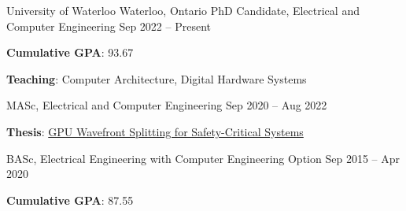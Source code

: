 

\begin{cventries}

\begin{cventrymulti}
{University of Waterloo}
{Waterloo, Ontario}
\cvposition
{PhD Candidate, Electrical and Computer Engineering}
{Sep 2022 -- Present}
{
  \begin{cvitems} %
    \item \textbf{Cumulative GPA}: 93.67
    \item \textbf{Teaching}: Computer Architecture, Digital Hardware Systems
  \end{cvitems}
}
\cvposition
{MASc, Electrical and Computer Engineering}
{Sep 2020 -- Aug 2022}
{
  \begin{cvitems} %
    \item \textbf{Thesis}: \href{https://uwspace.uwaterloo.ca/handle/10012/18872}{GPU Wavefront Splitting for Safety-Critical Systems}
  \end{cvitems}
}
\cvposition
{BASc, Electrical Engineering with Computer Engineering Option}
{Sep 2015 -- Apr 2020}
{
  \begin{cvitems}
    \item \textbf{Cumulative GPA}: 87.55
  \end{cvitems}
}
\end{cventrymulti}

\end{cventries}
